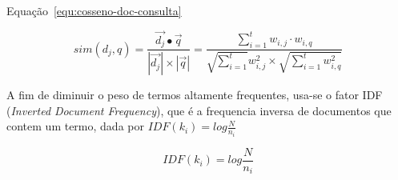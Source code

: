 \documentclass[10pt,a4paper]{article}
\begin{document}
 
 
 Equação~\ref{equ:cosseno-doc-consulta}	
 
\begin{equation}
sim(d_j, q) = \frac{ \vec{d_j} \bullet \vec{q} }
                   { |\vec{d_j}| \times | \vec{q}|}
            = \frac{ \sum_{i=1}^{t} w_{i,j} \cdot w_{i,q} }
                   { \sqrt{\sum_{i=1}^{t}} w_{i,j}^2 \times \sqrt{\sum_{i=1}^{t} w_{i,q}^2 } }                   \label{equ:cosseno-doc-consulta}		                   
\end{equation} 
 
 
 
A fim de diminuir o peso de termos altamente frequentes, usa-se o fator IDF (\textit{Inverted Document Frequency}), que é a frequencia inversa de documentos que contem um termo, dada por $IDF(k_i) = log\frac{N}{n_i}$ 
 
 
\begin{equation}
IDF(k_i) = log\frac{N}{n_i}
\label{equ:IDF}
\end{equation}
 
\end{document}
